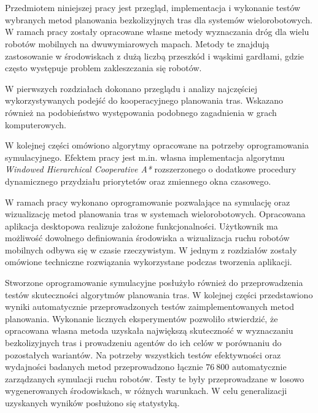 \\

\\

\begin{singlespacing}

Przedmiotem niniejszej pracy jest przegląd, implementacja i wykonanie testów wybranych metod planowania bezkolizyjnych tras dla systemów wielorobotowych.
W ramach pracy zostały opracowane własne metody wyznaczania dróg dla wielu robotów mobilnych na dwuwymiarowych mapach.
Metody te znajdują zastosowanie w środowiskach z dużą liczbą przeszkód i wąskimi gardłami, gdzie często występuje problem zakleszczania się robotów.

W pierwszych rozdziałach dokonano przeglądu i analizy najczęściej wykorzystywanych podejść do kooperacyjnego planowania tras.
Wskazano również na podobieństwo występowania podobnego zagadnienia w grach komputerowych.

W kolejnej części omówiono algorytmy opracowane na potrzeby oprogramowania symulacyjnego.
Efektem pracy jest m.in. własna implementacja algorytmu {\it Windowed Hierarchical Cooperative A*} rozszerzonego o dodatkowe procedury dynamicznego przydziału priorytetów oraz zmiennego okna czasowego.

W ramach pracy wykonano oprogramowanie pozwalające na symulację oraz wizualizację metod planowania tras w systemach wielorobotowych.
Opracowana aplikacja desktopowa realizuje założone funkcjonalności.
Użytkownik ma możliwość dowolnego definiowania środowiska a wizualizacja ruchu robotów mobilnych odbywa się w czasie rzeczywistym.
W jednym z rozdziałów zostały omówione techniczne rozwiązania wykorzystane podczas tworzenia aplikacji.

Stworzone oprogramowanie symulacyjne posłużyło również do przeprowadzenia testów skuteczności algorytmów planowania tras.
W kolejnej części przedstawiono wyniki automatycznie przeprowadzonych testów zaimplementowanych metod planowania.
Wykonanie licznych eksperymentów pozwoliło stwierdzić, że opracowana własna metoda uzyskała największą skuteczność w wyznaczaniu bezkolizyjnych tras i prowadzeniu agentów do ich celów w porównaniu do pozostałych wariantów.
Na potrzeby wszystkich testów efektywności oraz wydajności badanych metod przeprowadzono łącznie $76\ 800$ automatycznie zarządzanych symulacji ruchu robotów.
Testy te były przeprowadzane w losowo wygenerowanych środowiskach, w różnych warunkach.
W celu generalizacji uzyskanych wyników posłużono się statystyką.



\end{singlespacing}
